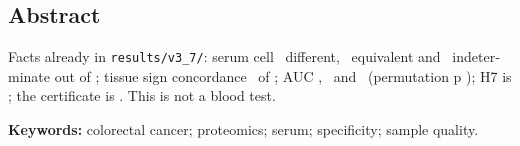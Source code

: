 \begin{otherlanguage}{english}
\chapter*{Abstract}

Facts already in \texttt{results/v3\_7/}: serum cell \SueroDif\ different, \SueroEq\ equivalent and \SueroInd\ indeterminate out of \SueroN; tissue sign concordance \TejidoNum\ of \TejidoDen; AUC \MlTodas, \MlCalidad\ and \MlSinCalidad\ (permutation p \MlSinCalidadP); H7 is \HsieteEstado; the certificate is \CertificadoEstado. This is not a blood test.

\noindent\textbf{Keywords:} colorectal cancer; proteomics; serum; specificity; sample quality.
\end{otherlanguage}
\clearpage
